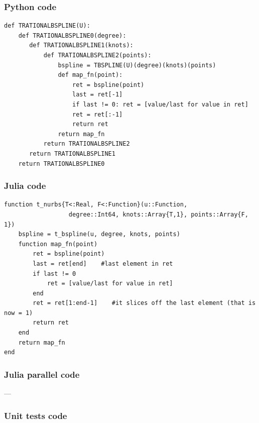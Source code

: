 \documentclass[a4paper,11pt]{article}
\begin{document}
\subsubsection{Python code}
\begin{verbatim}
def TRATIONALBSPLINE(U):
    def TRATIONALBSPLINE0(degree):
       def TRATIONALBSPLINE1(knots):
           def TRATIONALBSPLINE2(points):
               bspline = TBSPLINE(U)(degree)(knots)(points)
               def map_fn(point):
                   ret = bspline(point)
                   last = ret[-1]
                   if last != 0: ret = [value/last for value in ret]
                   ret = ret[:-1]
                   return ret
               return map_fn
           return TRATIONALBSPLINE2
       return TRATIONALBSPLINE1
    return TRATIONALBSPLINE0
\end{verbatim}

\subsubsection{Julia code}

\begin{verbatim}
function t_nurbs{T<:Real, F<:Function}(u::Function, 
                  degree::Int64, knots::Array{T,1}, points::Array{F, 1})
    bspline = t_bspline(u, degree, knots, points)
    function map_fn(point)
        ret = bspline(point)
        last = ret[end]    #last element in ret
        if last != 0
            ret = [value/last for value in ret]
        end
        ret = ret[1:end-1]    #it slices off the last element (that is now = 1)
        return ret
    end
    return map_fn
end
\end{verbatim}

\subsubsection{Julia parallel code}
---

\subsubsection{Unit tests code}
\end{document}

